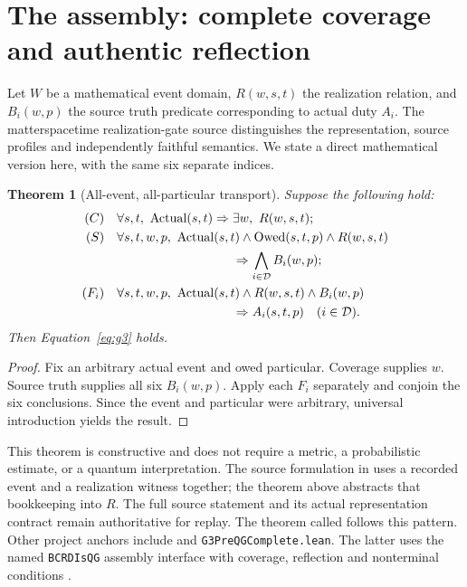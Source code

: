 \documentclass[11pt,a4paper]{article}
\newtheorem{theorem}{Theorem}[section]\newtheorem{proposition}[theorem]{Proposition}\newtheorem{definition}[theorem]{Definition}\newtheorem{example}[theorem]{Example}
\begin{document}
\section{The assembly: complete coverage and authentic reflection}
Let $W$ be a mathematical event domain, $R(w,s,t)$ the realization relation, and $B_i(w,p)$ the source truth predicate corresponding to actual duty $A_i$. The matterspacetime realization-gate source distinguishes the representation, source profiles and independently faithful semantics. We state a direct mathematical version here, with the same six separate indices.
\begin{theorem}[All-event, all-particular transport]\label{thm:transport}
Suppose the following hold:
\begin{align*}
(C)\quad &\forall s,t,\ \Act(s,t)\Rightarrow \exists w,\ R(w,s,t);\\
(S)\quad &\forall s,t,w,p,\ \Act(s,t)\land\Owed(s,t,p)\land R(w,s,t)\\
&\hspace{32mm}\Rightarrow \bigwedge_{i\in\Dut} B_i(w,p);\\
(F_i)\quad &\forall s,t,w,p,\ \Act(s,t)\land R(w,s,t)\land B_i(w,p)\\
&\hspace{32mm}\Rightarrow A_i(s,t,p) \quad (i\in\Dut).
\end{align*}
Then Equation~\eqref{eq:g3} holds.
\end{theorem}
\begin{proof} Fix an arbitrary actual event and owed particular. Coverage supplies $w$. Source truth supplies all six $B_i(w,p)$. Apply each $F_i$ separately and conjoin the six conclusions. Since the event and particular were arbitrary, universal introduction yields the result.\end{proof}
This theorem is constructive and does not require a metric, a probabilistic estimate, or a quantum interpretation. The source formulation in\newline {} uses a recorded event and a realization witness together; the theorem above abstracts that bookkeeping into $R$. The full source statement and its actual representation contract remain authoritative for replay. The theorem called  follows this pattern. Other project anchors include  and \texttt{G3PreQGComplete.lean}. The latter uses the named \texttt{BCRDIsQG} assembly interface with coverage, reflection and nonterminal conditions \cite{assembly}.
\end{document}
